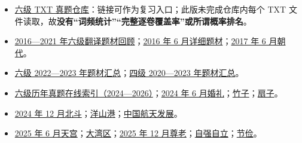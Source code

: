 \documentclass[a4paper,11pt,UTF8,fontset=none]{ctexart}
\begin{document}
\begin{itemize}[leftmargin=1.7em,itemsep=1pt,parsep=0pt,topsep=2pt]
\item \noindent \href{\detokenize{https://github.com/AndrewYuZhenYu/cet6_exam_questions_txt_collection/tree/main/cet6_zhenti_cleaned}}{六级 TXT 真题仓库}：链接可作为复习入口；此版未完成仓库内每个 TXT 文件读取，故{\bfseries 没有“词频统计”“完整逐卷覆盖率”或所谓概率排名}。\par


\end{itemize}

\par

\begin{itemize}[leftmargin=1.7em,itemsep=1pt,parsep=0pt,topsep=2pt]
\item \noindent \href{\detokenize{https://www.sohu.com/a/508470650_121124019}}{2016—2021 年六级翻译题材回顾}；\href{\detokenize{https://mtoutiao.xdf.cn/cet4-6/202601/15084316.html}}{2016 年 6 月详细题材}；\href{\detokenize{https://mtoutiao.xdf.cn/cet4-6/202601/15084355.html}}{2017 年 6 月朝代}。\par


\item \noindent \href{\detokenize{https://cet46.wendu.com/m/2023/1208/58414.shtml}}{六级 2022—2023 年题材汇总}；\href{\detokenize{https://cet46.wendu.com/m/2023/1208/58413.shtml}}{四级 2020—2023 年题材汇总}。\par


\item \noindent \href{\detokenize{https://eol.nju.edu.cn/cet6/}}{六级历年真题在线索引（2024—2026）}；\href{\detokenize{https://eol.nju.edu.cn/cet6/papers/202406-1.html}}{2024 年 6 月婚礼}；\href{\detokenize{https://eol.nju.edu.cn/cet6/papers/202406-2.html}}{竹子}；\href{\detokenize{https://eol.nju.edu.cn/cet6/papers/202406-3.html}}{扇子}。\par


\item \noindent \href{\detokenize{https://eol.nju.edu.cn/cet6/papers/202412-1.html}}{2024 年 12 月北斗}；\href{\detokenize{https://eol.nju.edu.cn/cet6/papers/202412-2.html}}{洋山港}；\href{\detokenize{https://eol.nju.edu.cn/cet6/papers/202412-3.html}}{中国航天发展}。\par


\item \noindent \href{\detokenize{https://eol.nju.edu.cn/cet6/papers/202506-1.html}}{2025 年 6 月天宫}；\href{\detokenize{https://eol.nju.edu.cn/cet6/papers/202506-2.html}}{大湾区}；\href{\detokenize{https://eol.nju.edu.cn/cet6/papers/202512-1.html}}{2025 年 12 月尊老}；\href{\detokenize{https://eol.nju.edu.cn/cet6/papers/202512-2.html}}{自强自立}；\href{\detokenize{https://eol.nju.edu.cn/cet6/papers/202512-3.html}}{节俭}。\par



\end{itemize}
\end{document}
